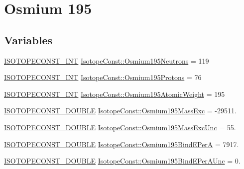 \hypertarget{group___isotope_const-_osmium-_os195}{}\section{Osmium 195}
\label{group___isotope_const-_osmium-_os195}
\subsection*{Variables}
\begin{DoxyCompactItemize}
\item 
\mbox{\hyperlink{group___isotope_const-_macros_ga5f18360b3e99483a35c32d789e62621c}{I\+S\+O\+T\+O\+P\+E\+C\+O\+N\+S\+T\+\_\+\+I\+NT}} \mbox{\hyperlink{group___isotope_const-_osmium-_os195_gac2560464c527a5f8159ce029370db584}{Isotope\+Const\+::\+Osmium195\+Neutrons}} = 119
\item 
\mbox{\hyperlink{group___isotope_const-_macros_ga5f18360b3e99483a35c32d789e62621c}{I\+S\+O\+T\+O\+P\+E\+C\+O\+N\+S\+T\+\_\+\+I\+NT}} \mbox{\hyperlink{group___isotope_const-_osmium-_os195_ga5b71c3226cb30450210ab55c053972bc}{Isotope\+Const\+::\+Osmium195\+Protons}} = 76
\item 
\mbox{\hyperlink{group___isotope_const-_macros_ga5f18360b3e99483a35c32d789e62621c}{I\+S\+O\+T\+O\+P\+E\+C\+O\+N\+S\+T\+\_\+\+I\+NT}} \mbox{\hyperlink{group___isotope_const-_osmium-_os195_gae5cca888050e95ed174e97ff97b10516}{Isotope\+Const\+::\+Osmium195\+Atomic\+Weight}} = 195
\item 
\mbox{\hyperlink{group___isotope_const-_macros_ga8f45a7272ce02c0b4c65c44636ed719a}{I\+S\+O\+T\+O\+P\+E\+C\+O\+N\+S\+T\+\_\+\+D\+O\+U\+B\+LE}} \mbox{\hyperlink{group___isotope_const-_osmium-_os195_ga6609e337c8afcc1ac24332a2ee3d1a0a}{Isotope\+Const\+::\+Osmium195\+Mass\+Exc}} = -\/29511.
\item 
\mbox{\hyperlink{group___isotope_const-_macros_ga8f45a7272ce02c0b4c65c44636ed719a}{I\+S\+O\+T\+O\+P\+E\+C\+O\+N\+S\+T\+\_\+\+D\+O\+U\+B\+LE}} \mbox{\hyperlink{group___isotope_const-_osmium-_os195_ga24bf3c1836602d9b430fee002454ba3e}{Isotope\+Const\+::\+Osmium195\+Mass\+Exc\+Unc}} = 55.
\item 
\mbox{\hyperlink{group___isotope_const-_macros_ga8f45a7272ce02c0b4c65c44636ed719a}{I\+S\+O\+T\+O\+P\+E\+C\+O\+N\+S\+T\+\_\+\+D\+O\+U\+B\+LE}} \mbox{\hyperlink{group___isotope_const-_osmium-_os195_ga433f07fe5cc899d0ca8845ada44270ee}{Isotope\+Const\+::\+Osmium195\+Bind\+E\+PerA}} = 7917.
\item 
\mbox{\hyperlink{group___isotope_const-_macros_ga8f45a7272ce02c0b4c65c44636ed719a}{I\+S\+O\+T\+O\+P\+E\+C\+O\+N\+S\+T\+\_\+\+D\+O\+U\+B\+LE}} \mbox{\hyperlink{group___isotope_const-_osmium-_os195_ga373c29bf595194acf5bd96c6cb729d4c}{Isotope\+Const\+::\+Osmium195\+Bind\+E\+Per\+A\+Unc}} = 0.

\end{DoxyCompactItemize}
